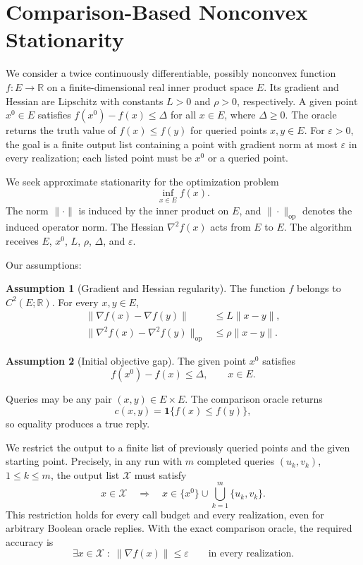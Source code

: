 \documentclass[10pt]{article}
\theoremstyle{definition}
\newtheorem{assumption}{Assumption}
\begin{document}
\section*{Comparison-Based Nonconvex Stationarity}
We consider a twice continuously differentiable, possibly nonconvex function $f:E\to\mathbb{R}$ on a finite-dimensional real inner product space $E$. Its gradient and Hessian are Lipschitz with constants $L>0$ and $\rho>0$, respectively. A given point $x^0\in E$ satisfies $f(x^0)-f(x)\leq\Delta$ for all $x\in E$, where $\Delta\geq0$. The oracle returns the truth value of $f(x)\leq f(y)$ for queried points $x,y\in E$. For $\varepsilon>0$, the goal is a finite output list containing a point with gradient norm at most $\varepsilon$ in every realization; each listed point must be $x^0$ or a queried point.

We seek approximate stationarity for the optimization problem
\[
\inf_{x\in E} f(x).
\]
The norm $\|\cdot\|$ is induced by the inner product on $E$, and $\|\cdot\|_{\mathrm{op}}$ denotes the induced operator norm. The Hessian $\nabla^2 f(x)$ acts from $E$ to $E$. The algorithm receives $E$, $x^0$, $L$, $\rho$, $\Delta$, and $\varepsilon$.

Our assumptions:
\begin{assumption}[Gradient and Hessian regularity]
The function $f$ belongs to $C^2(E;\mathbb{R})$. For every $x,y\in E$,
\[
\begin{aligned}
\|\nabla f(x)-\nabla f(y)\|&\leq L\|x-y\|,\\
\|\nabla^2 f(x)-\nabla^2 f(y)\|_{\mathrm{op}}&\leq\rho\|x-y\|.
\end{aligned}
\]
\end{assumption}

\begin{assumption}[Initial objective gap]
The given point $x^0$ satisfies
\[
f(x^0)-f(x)\leq\Delta,
\qquad x\in E.
\]
\end{assumption}

Queries may be any pair $(x,y)\in E\times E$. The comparison oracle returns
\[
c(x,y)=\mathbf{1}\{f(x)\leq f(y)\},
\]
so equality produces a true reply.

We restrict the output to a finite list of previously queried points and the given starting point. Precisely, in any run with $m$ completed queries $(u_k,v_k)$, $1\leq k\leq m$, the output list $\mathcal{X}$ must satisfy
\[
x\in\mathcal{X}
\quad\Longrightarrow\quad
x\in\{x^0\}\cup\bigcup_{k=1}^{m}\{u_k,v_k\}.
\]
This restriction holds for every call budget and every realization, even for arbitrary Boolean oracle replies. With the exact comparison oracle, the required accuracy is
\[
\exists x\in\mathcal{X}\;:\;\|\nabla f(x)\|\leq\varepsilon
\qquad\text{in every realization}.
\]
\end{document}
